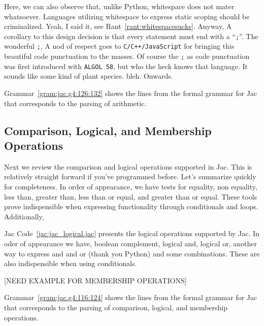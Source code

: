 
Here, we can also observe that, unlike Python, whitespace does not mater whatsoever. Languages utilizing whitespace to express static scoping should be criminalized. Yeah, I said it, see Rant~\ref{rant:whitespacesucks}. Anyway, A corollary to this design decision is that every statement must end with a ``\texttt{;}''. The wonderful \texttt{;}, A nod of respect goes to \texttt{C/C++/JavaScript} for bringing this beautiful code punctuation to the masses. Of course the \texttt{;} as code punctuation was first introduced with \texttt{ALGOL 58}, but who the heck knows that language. It sounds like some kind of plant species. \Gls{bleh}. Onwards.

\begin{nerd}
    Grammar~\ref{gram:jac.g4:126:132} shows  the lines from the formal grammar for Jac that corresponds to the parsing of arithmetic.
\end{nerd}

\subsection{Comparison, Logical, and Membership Operations}
Next we review the comparison and logical operations supported in Jac. This is relatively straight forward if you've programmed before. Let's summarize quickly for completeness.
In order of appearance, we have tests for equality, non equality, less than, greater than, less than or equal, and greater than or equal. These tools prove indispensible when expressing functionality through conditionals and loops. Additionally,

Jac Code~\ref{jac:jac_logical.jac} presents the logical operations supported by Jac. In oder of appearance we have, boolean complement, logical and, logical or, another way to express and and or (thank you Python) and some combinations. These are also indispensible when using conditionals.

    [NEED EXAMPLE FOR MEMBERSHIP OPERATIONS]

\begin{nerd}
    Grammar~\ref{gram:jac.g4:116:124} shows the lines from the formal grammar for Jac that corresponds to the parsing of comparison, logical, and membership operations.
\end{nerd}

